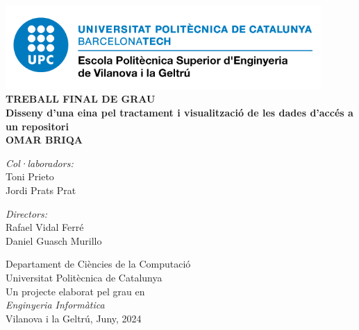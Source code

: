 \begin{titlepage}
    \begin{center}

        \vspace*{-3cm}
        \includegraphics[width=0.9\textwidth]{figures/epsevg-logo} \\ [1cm]

        \huge
        \textbf{TREBALL FINAL DE GRAU} \\ [1.5cm]

        \huge
        \textbf{Disseny d'una eina pel tractament i visualització de les dades d'accés a un repositori} \\ [1.5cm]

        \LARGE
        \textbf{OMAR BRIQA} \\ [1.5cm]

        \begin{minipage}[t]{0.48\textwidth}
            \begin{center}
                \Large
                \textit{Col·laboradors:} \\ [0.2cm]
                \LARGE
                Toni Prieto \\
                Jordi Prats Prat
            \end{center}
        \end{minipage}
        \hfill
        \begin{minipage}[t]{0.48\textwidth}
            \begin{center}
                \Large
                \textit{Directors:} \\ [0.2cm]
                \LARGE
                Rafael Vidal Ferré \\
                Daniel Guasch Murillo
            \end{center}
        \end{minipage}

        \vspace{1.5cm}

        \Large
        Departament de Ciències de la Computació \\
        Universitat Politècnica de Catalunya \\ [1cm]

        \large
        Un projecte elaborat pel grau en \\ [0.2cm]
        \textit{Enginyeria Informàtica} \\ [0.4cm]
        Vilanova i la Geltrú, Juny, 2024

    \end{center}
\end{titlepage}
